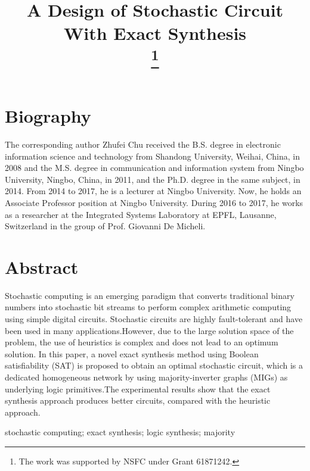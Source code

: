 \documentclass[conference,letterpaper]{IEEEtran}
\begin{document}
\title{A Design of Stochastic Circuit With Exact Synthesis\\
\thanks{The work was supported by NSFC under Grant 61871242.}
}

\author{
}

\maketitle

\section*{\textbf{Biography}}
The corresponding author Zhufei Chu received the B.S. degree in electronic information science and technology from Shandong University, Weihai, China, in 2008 and the M.S. degree in communication and information system from Ningbo University, Ningbo, China, in 2011, and the Ph.D. degree in the same subject, in 2014. From 2014 to 2017, he is a lecturer at Ningbo University. Now, he holds an Associate Professor position at Ningbo University. During 2016 to 2017, he works as a researcher at the Integrated Systems Laboratory at EPFL, Lausanne, Switzerland in the group of Prof. Giovanni De Micheli. 

\section*{\textbf{Abstract}}
Stochastic computing is an emerging paradigm that converts traditional binary numbers into stochastic bit streams to perform complex arithmetic computing using simple digital circuits. Stochastic circuits are highly fault-tolerant and have been used in many applications.However, due to the large solution space of the problem, the use of heuristics is complex and does not lead to an optimum solution. In this paper, a novel exact synthesis method using Boolean satisfiability (SAT) is proposed to obtain an optimal stochastic circuit, which is a dedicated homogeneous network by using majority-inverter graphs (MIGs) as underlying logic primitives.The experimental results show that the exact synthesis approach produces better circuits, compared with the heuristic approach.  
\vspace{2ex}

\begin{IEEEkeywords}
stochastic computing; exact synthesis; logic synthesis; majority
\end{IEEEkeywords}
\end{document}
